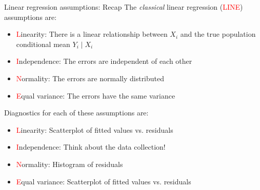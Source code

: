 \documentclass[10pt,t]{beamer}
\begin{document}
\begin{frame}{Linear regression assumptions: Recap}
The \textit{classical} linear regression (\textcolor{red}{LINE}) assumptions are:

\vspace{0.3cm}

\begin{itemize}
	\item \textcolor{red}{L}inearity: There is a linear relationship between $X_i$ and the true population conditional mean $Y_i \mid X_i$
	\item \textcolor{red}{I}ndependence: The errors are independent of each other
	\item \textcolor{red}{N}ormality: The errors are normally distributed
	\item \textcolor{red}{E}qual variance: The errors have the same variance
\end{itemize} \pause

\vspace{0.3cm}

Diagnostics for each of these assumptions are:

\vspace{0.3cm}

\begin{itemize}
	\item \textcolor{red}{L}inearity: Scatterplot of fitted values vs. residuals
	\item \textcolor{red}{I}ndependence: Think about the data collection!
	\item \textcolor{red}{N}ormality: Histogram of residuals
	\item \textcolor{red}{E}qual variance: Scatterplot of fitted values vs. residuals
\end{itemize}

\end{frame}
\end{document}

